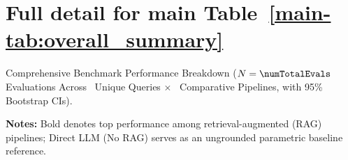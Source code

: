 \clearpage
\section{Full detail for main Table~\ref{main-tab:overall_summary}}
\label{detail-tab:overall_summary}
Comprehensive Benchmark Performance Breakdown ($N=\numTotalEvals$ Evaluations Across \numUniqueQueries\ Unique Queries $\times$ \numComparativePipelines\ Comparative Pipelines, with 95\% Bootstrap CIs).\par\medskip
\noindent{}\par\medskip
\noindent \textbf{Notes:} Bold denotes top performance among retrieval-augmented (RAG) pipelines; Direct LLM (No RAG) serves as an ungrounded parametric baseline reference.